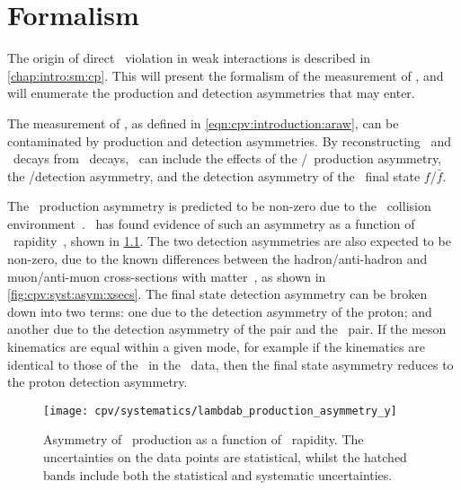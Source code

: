 \chapter{Formalism}
\label{chap:cpv:theory}

The origin of direct \CP\ violation in weak interactions is described in 
\cref{chap:intro:sm:cp}.
This  will present the formalism of the measurement 
of \dACP, and will enumerate the production and detection asymmetries that may 
enter.

The measurement of \ARaw, as defined in \cref{eqn:cpv:introduction:araw}, can 
be contaminated by production and detection asymmetries.
By reconstructing \LcTopKK\ and \LcToppipi\ decays from 
\ decays, \ARaw\ can include the effects of 
the \PLambdab/\APLambdab\ production asymmetry, the \Pmuon/\APmuon detection 
asymmetry, and the detection asymmetry of the \PLambdac\ final state 
$f$/$\bar{f}$.

The \PLambdab\ production asymmetry is predicted to be non-zero due to the \pp\ 
collision environment~\cite{PhysRevD.90.014023}.
\lhcb\ has found evidence of such an asymmetry as a function of \PLambdab\ 
rapidity~\cite{Aaij:2015fea}, shown in \cref{fig:cpv:syst:asym:lambdab}.
The two detection asymmetries are also expected to be non-zero, due to the 
known differences between the hadron/anti-hadron and muon/anti-muon 
cross-sections with matter~\cite{PDG2014}, as shown in 
\cref{fig:cpv:syst:asym:xsecs}.
The final state detection asymmetry can be broken down into two terms: one due 
to the detection asymmetry of the proton; and another due to the detection 
asymmetry of the \KmKp pair and the \pimpip\ pair.
If the meson kinematics are equal within a given mode, for example if the 
\PKminus kinematics are identical to those of the \PKplus\ in the \pKK\ data, 
then the final state asymmetry reduces to the proton detection asymmetry.

\begin{figure}
  \centering
  \texttt{[image: cpv/systematics/lambdab\_production\_asymmetry\_y]}
  \caption{%
    Asymmetry of \PLambdab\ production as a function of \PLambdab\ rapidity.
    The uncertainties on the data points are statistical, whilst the hatched 
    bands include both the statistical and systematic uncertainties.
  }
  \label{fig:cpv:syst:asym:lambdab}
\end{figure}

